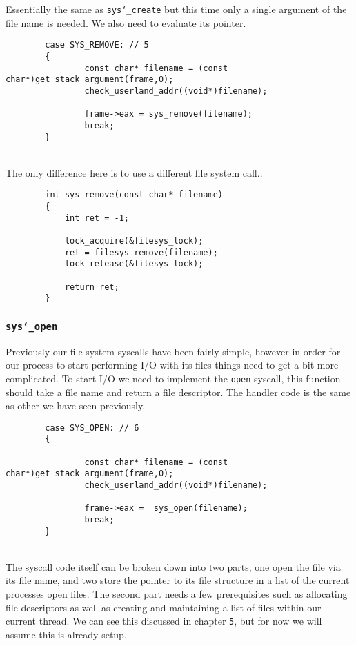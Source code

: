 \documentclass[]{article}
\begin{document}
  Essentially the same as \texttt{sys\char`_create} but this time only a single argument of the file name is needed. We also need to evaluate its pointer.
			\lstset{language=C, tabsize=2}  
		    \begin{lstlisting}   
		case SYS_REMOVE: // 5
		{
				const char* filename = (const char*)get_stack_argument(frame,0);
				check_userland_addr((void*)filename);
			
				frame->eax = sys_remove(filename);
				break;
		}
		   \end{lstlisting}	
		   \texttt{}\\
		   The only difference here is to use a different file system call..
  
			\lstset{language=C, tabsize=2}  
		    \begin{lstlisting}   
		int sys_remove(const char* filename)
		{
			int ret = -1;
	
			lock_acquire(&filesys_lock);
			ret = filesys_remove(filename);
			lock_release(&filesys_lock);
	
			return ret;
		}
		   \end{lstlisting}	    
		   \newpage
		   
  
  \subsubsection{\texttt{sys\char`_open}}
  
  
  	Previously our file system syscalls have been fairly simple, however in order for our process to start performing I/O with its files things need to get a bit more complicated. To start I/O we need to implement the \texttt{open} syscall, this function should take a file name and return a file descriptor. The handler code is the same as other we have seen previously.
  
  
  			\lstset{language=C, tabsize=2}  
		    \begin{lstlisting}   
		case SYS_OPEN: // 6
		{
		
				const char* filename = (const char*)get_stack_argument(frame,0);
				check_userland_addr((void*)filename);

				frame->eax =  sys_open(filename);
				break;
		}
		   \end{lstlisting}	
		   \newpage
		   \textbf{}\\
		 The syscall code itself can be broken down into two parts, one open the file via its file name, and two store the pointer to its file structure in a list of the current processes open files. The second part needs a few prerequisites such as allocating file descriptors as well as creating and maintaining a list of files within our current thread. We can see this discussed in chapter \texttt{5}, but for now we will assume this is already setup. 
  
\end{document}
